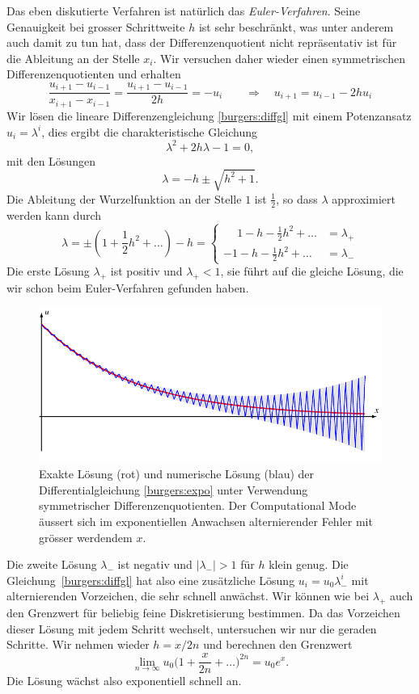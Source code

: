 Das eben diskutierte Verfahren ist natürlich das {\em Euler-Verfahren}.
Seine Genauigkeit bei grosser Schrittweite $h$ ist sehr beschränkt,
was unter anderem auch damit zu tun hat, dass der Differenzenquotient
nicht repräsentativ ist für die Ableitung an der Stelle $x_i$.
Wir versuchen daher wieder einen symmetrischen Differenzenquotienten
und erhalten
\begin{equation}
\frac{u_{i+1}-u_{i-1}}{x_{i+1}-x_{i-1}}
=
\frac{u_{i+1}-u_{i-1}}{2h}
=
-u_{i}
\qquad\Rightarrow\quad
u_{i+1}=u_{i-1}-2hu_{i}
\label{burgers:diffgl}
\end{equation}
Wir lösen die lineare Differenzengleichung \eqref{burgers:diffgl} mit einem
Potenzansatz $u_i=\lambda^i$, dies ergibt die charakteristische Gleichung
\[
\lambda^2+2h\lambda-1=0,
\]
mit den Lösungen
\[
\lambda = -h\pm\sqrt{h^2+1}.
\]
Die Ableitung der Wurzelfunktion an der Stelle $1$ ist $\frac12$, so dass
$\lambda$ approximiert werden kann durch
\[
\lambda = \pm(1+\frac12h^2+\dots)- h
=
\begin{cases}
\phantom{-}1-h-\frac12h^2+\dots&=\lambda_+\\
-1-h-\frac12h^2+\dots&=\lambda_-
\end{cases}
\]
Die erste Lösung $\lambda_+$ ist positiv und $\lambda_+<1$, sie führt auf
die gleiche Lösung, die wir schon beim Euler-Verfahren gefunden haben.
\begin{figure}
\centering
\includegraphics{learning/compmod.pdf}
\caption{Exakte Lösung (rot) und numerische Lösung (blau)
der Differentialgleichung
\eqref{burgers:expo}
unter Verwendung symmetrischer Differenzenquotienten.
Der Computational Mode äussert sich im exponentiellen Anwachsen
alternierender Fehler mit grösser werdendem $x$.
\label{burgers:compmod}}
\end{figure}

Die zweite Lösung $\lambda_-$ ist negativ und $|\lambda_-|>1$ für $h$
klein genug.
Die Gleichung~\eqref{burgers:diffgl} hat also eine zusätzliche Lösung
$u_i=u_0\lambda_-^i$ mit alternierenden Vorzeichen, die sehr schnell anwächst.
Wir können wie bei $\lambda_+$ auch den Grenzwert für beliebig feine
Diskretisierung bestimmen.
Da das Vorzeichen dieser Lösung mit jedem Schritt wechselt, untersuchen
wir nur die geraden Schritte.
Wir nehmen wieder $h=x/2n$ und berechnen den Grenzwert
\[
\lim_{n\to\infty}
u_0
\biggl(
1+\frac{x}{2n}+\dots
\biggr)^{2n}
=
u_0e^x.
\]
Die Lösung wächst also exponentiell schnell an.

